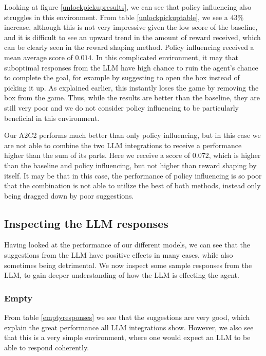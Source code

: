 \documentclass[conference]{IEEEtran}
\begin{document}
Looking at figure \ref{unlockpickupresults}, we can see that policy influencing also struggles in this environment. From table \ref{unlockpickuptable}, we see a $43\%$ increase, although this is not very impressive given the low score of the baseline, and it is difficult to see an upward trend in the amount of reward received, which can be clearly seen in the reward shaping method. Policy influencing received a mean average score of $0.014$. In this complicated environment, it may that suboptimal responses from the LLM have high chance to ruin the agent's chance to complete the goal, for example by suggesting to open the box instead of picking it up. As explained earlier, this instantly loses the game by removing the box from the game. Thus, while the results are better than the baseline, they are still very poor and we do not consider policy influencing to be particularly beneficial in this environment.

Our A2C2 performs much better than only policy influencing, but in this case we are not able to combine the two LLM integrations to receive a performance higher than the sum of its parts. Here we receive a score of $0.072$, which is higher than the baseline and policy influencing, but not higher than reward shaping by itself. It may be that in this case, the performance of policy influencing is so poor that the combination is not able to utilize the best of both methods, instead only being dragged down by poor suggestions.

\subsection{Inspecting the LLM responses}
\label{llmresponse}

Having looked at the performance of our different models, we can see that the suggestions from the LLM have positive effects in many cases, while also sometimes being detrimental. We now inspect some sample responses from the LLM, to gain deeper understanding of how the LLM is effecting the agent.

\subsubsection{Empty}

From table \ref{emptyresponses} we see that the suggestions are very good, which explain the great performance all LLM integrations show. However, we also see that this is a very simple environment, where one would expect an LLM to be able to respond coherently.
\end{document}
